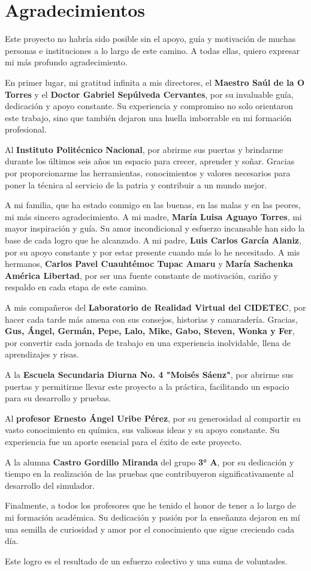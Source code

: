 \chapter{Agradecimientos}
Este proyecto no habría sido posible sin el apoyo, guía y motivación de muchas personas e instituciones a lo largo de este camino. A todas ellas, quiero expresar mi más profundo agradecimiento.

En primer lugar, mi gratitud infinita a mis directores, el \textbf{Maestro Saúl de la O Torres} y el \textbf{Doctor Gabriel Sepúlveda Cervantes}, por su invaluable guía, dedicación y apoyo constante. Su experiencia y compromiso no solo orientaron este trabajo, sino que también dejaron una huella imborrable en mi formación profesional.

Al \textbf{Instituto Politécnico Nacional}, por abrirme sus puertas y brindarme durante los últimos seis años un espacio para crecer, aprender y soñar. Gracias por proporcionarme las herramientas, conocimientos y valores necesarios para poner la técnica al servicio de la patria y contribuir a un mundo mejor.

A mi familia, que ha estado conmigo en las buenas, en las malas y en las peores, mi más sincero agradecimiento. A mi madre, \textbf{María Luisa Aguayo Torres}, mi mayor inspiración y guía. Su amor incondicional y esfuerzo incansable han sido la base de cada logro que he alcanzado. A mi padre, \textbf{Luis Carlos García Alaniz}, por su apoyo constante y por estar presente cuando más lo he necesitado. A mis hermanos, \textbf{Carlos Pavel Cuauhtémoc Tupac Amaru} y \textbf{María Sachenka América Libertad}, por ser una fuente constante de motivación, cariño y respaldo en cada etapa de este camino.

A mis compañeros del \textbf{Laboratorio de Realidad Virtual del CIDETEC}, por hacer cada tarde más amena con sus consejos, historias y camaradería. Gracias, \textbf{Gus, Ángel, Germán, Pepe, Lalo, Mike, Gabo, Steven, Wonka y Fer}, por convertir cada jornada de trabajo en una experiencia inolvidable, llena de aprendizajes y risas.

A la \textbf{Escuela Secundaria Diurna No. 4 "Moisés Sáenz"}, por abrirme sus puertas y permitirme llevar este proyecto a la práctica, facilitando un espacio para su desarrollo y pruebas.

Al \textbf{profesor Ernesto Ángel Uribe Pérez}, por su generosidad al compartir su vasto conocimiento en química, sus valiosas ideas y su apoyo constante. Su experiencia fue un aporte esencial para el éxito de este proyecto.

A la alumna \textbf{Castro Gordillo Miranda} del grupo \textbf{3° A}, por su dedicación y tiempo en la realización de las pruebas que contribuyeron significativamente al desarrollo del simulador.

Finalmente, a todos los profesores que he tenido el honor de tener a lo largo de mi formación académica. Su dedicación y pasión por la enseñanza dejaron en mí una semilla de curiosidad y amor por el conocimiento que sigue creciendo cada día.

Este logro es el resultado de un esfuerzo colectivo y una suma de voluntades.
\newpage
